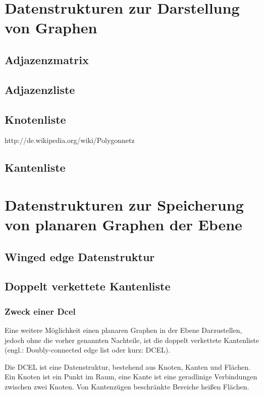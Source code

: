 \documentclass[a4paper]{article}
\begin{document}
\section{Datenstrukturen zur Darstellung von Graphen}
\subsection{Adjazenzmatrix}
\subsection{Adjazenzliste}
\subsection{Knotenliste}
http://de.wikipedia.org/wiki/Polygonnetz
\subsection{Kantenliste}
\section{Datenstrukturen zur Speicherung von planaren Graphen der Ebene}
\subsection{Winged edge Datenstruktur}
\subsection{Doppelt verkettete Kantenliste}
\subsubsection{Zweck einer Dcel}\label{Inhalt_Dcel}
Eine weitere Möglichkeit einen planaren Graphen in der Ebene Darzustellen, jedoch ohne die vorher genannten Nachteile, ist die doppelt verkettete Kantenliste (engl.: Doubly-connected edge list oder kurz: DCEL).

Die DCEL ist eine Datenstruktur, bestehend aus Knoten, Kanten und Flächen. Ein Knoten ist ein Punkt im Raum, eine Kante ist eine geradlinige Verbindungen zwischen zwei Knoten. Von Kantenzügen beschränkte Bereiche heißen Flächen.
\end{document}
